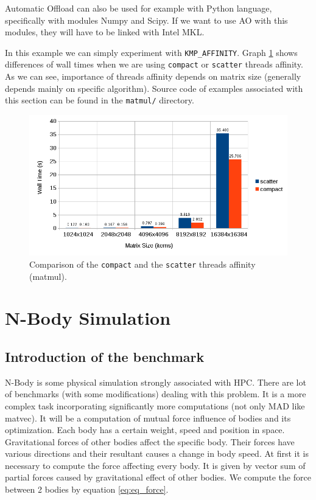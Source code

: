 \par Automatic Offload can also be used for example with Python language, specifically with modules Numpy and Scipy. If we want to use AO with this modules, they will have to be linked with Intel MKL.

\par In this example we can simply experiment with \texttt{KMP\_AFFINITY}. Graph \ref{fig:matmul_affinity} shows differences of wall times when we are using \texttt{compact} or \texttt{scatter} threads affinity. As we can see, importance of threads affinity depends on matrix size (generally depends mainly on specific algorithm). Source code of examples associated with this section can be found in the \texttt{matmul/} directory.

\begin{figure}[htbp]
    \centering
    \includegraphics[width=1\linewidth]{fig/matmul_affinity_test.png}
    \caption{Comparison of the \texttt{compact} and the \texttt{scatter} threads affinity (matmul).}
    \label{fig:matmul_affinity}
\end{figure} 

\section{N-Body Simulation}

\subsection{Introduction of the benchmark}
N-Body is some physical simulation strongly associated with HPC. There are lot of benchmarks (with some modifications) dealing with this problem. It is a more complex task incorporating significantly more computations (not only MAD like matvec). It will be a computation of mutual force influence of bodies and its optimization. Each body has a certain weight, speed and position in space. Gravitational forces of other bodies affect the specific body. Their forces have various directions and their resultant causes a change in body speed. At first it is necessary to compute the force affecting every body. It is given by vector sum of partial forces caused by gravitational effect of other bodies. We compute the force between 2 bodies by equation \ref{eq:eq_force}.

